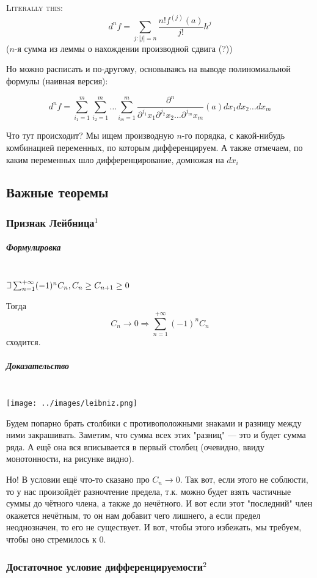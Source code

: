 \documentclass{article}
\def\letus{%
\mathord{\setbox0=\hbox{$\exists$}%
         \hbox{\kern 0.125\wd0%
               \vbox to \ht0{%
                  \hrule width 0.75\wd0%
                  \vfill%
                  \hrule width 0.75\wd0}%
               \vrule height \ht0%
               \kern 0.125\wd0}%
       }%
        }
\let\vanillasubparagraph\subparagraph
\renewcommand{\subparagraph}[1]{\vanillasubparagraph{#1}\mbox{}\\}
\begin{document}
\textsc{Literally this: }
\[ d^n f = \sum_{j : |j| = n}{\frac{n! f^{(j)} (a)}{j!}}h^j \] ($n$-я сумма из леммы о нахождении производной сдвига (?))

Но можно расписать и по-другому, основываясь на выводе полиномиальной формулы (наивная версия):

\[d^n f = \sum_{i_1 = 1}^m \sum_{i_2 = 1}^m \dots \sum_{i_m = 1}^m \frac{\partial^n}{\partial^{j_1}{x_1}\partial^{j_2}{x_2}\ldots\partial^{j_m}{x_m}}(a)dx_1dx_2\ldots dx_m\]

Что тут происходит? Мы ищем производную $n$-го порядка, с какой-нибудь комбинацией переменных, по которым дифференцируем. А также отмечаем, по каким переменных шло дифференцирование, домножая на $dx_i$

\newpage
\subsection{Важные теоремы}

\subsubsection{Признак Лейбница\texorpdfstring{$^1$}{}}
\subparagraph{Формулировка}
$\letus \sum_{n=1}^{+\infty} (-1)^n C_n, C_n \ge C_{n+1} \ge 0$

Тогда
$$
C_n \rightarrow 0 \Rightarrow \sum_{n=1}^{+\infty} (-1)^n C_n
$$
сходится.

\subparagraph{Доказательство}
\texttt{[image: ../images/leibniz.png]}

Будем попарно брать столбики с противоположными знаками и разницу между ними закрашивать. Заметим, что сумма всех этих "разниц" --- это и будет сумма ряда. А ещё она вся вписывается в первый столбец (очевидно, ввиду монотонности, на рисунке видно).

Но! В условии ещё что-то сказано про $C_n \rightarrow 0$. Так вот, если этого не соблюсти, то у нас произойдёт разночтение предела, т.к. можно будет взять частичные суммы до чётного члена, а также до нечётного. И вот если этот "последний" член окажется нечётным, то он нам добавит чего лишнего, а если предел неоднозначен, то его не существует. И вот, чтобы этого избежать, мы требуем, чтобы оно стремилось к $0$.


\subsubsection{Достаточное условие дифференцируемости\texorpdfstring{$^2$}{}}
\end{document}
